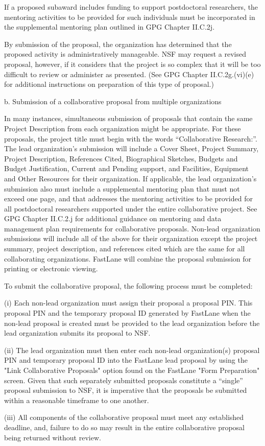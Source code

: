\documentclass[pdftex,12pt,fullpage,oneside]{amsart}
\begin{document}
If a proposed subaward includes funding to support postdoctoral
researchers, the mentoring activities to be provided for such
individuals must be incorporated in the supplemental mentoring plan
outlined in GPG Chapter II.C.2j.

By submission of the proposal, the organization has determined that
the proposed activity is administratively manageable.  NSF may request
a revised proposal, however, if it considers that the project is so
complex that it will be too difficult to review or administer as
presented.  (See GPG Chapter II.C.2g.(vi)(e) for additional
instructions on preparation of this type of proposal.)

 b. Submission of a collaborative proposal from multiple organizations

In many instances, simultaneous submission of proposals that contain
the same Project Description from each organization might be
appropriate.  For these proposals, the project title must begin with
the words ``Collaborative Research:''.  The lead organization's
submission will include a Cover Sheet, Project Summary, Project
Description, References Cited, Biographical Sketches, Budgets and
Budget Justification, Current and Pending support, and Facilities,
Equipment and Other Resources for their organization.  If applicable,
the lead organization’s submission also must include a supplemental
mentoring plan that must not exceed one page, and that addresses the
mentoring activities to be provided for all postdoctoral researchers
supported under the entire collaborative project.  See GPG Chapter
II.C.2.j for additional guidance on mentoring and data management plan
requirements for collaborative proposals.  Non-lead organization
submissions will include all of the above for their organization
except the project summary, project description, and references cited
which are the same for all collaborating organizations.  FastLane will
combine the proposal submission for printing or electronic viewing.

To submit the collaborative proposal, the following process must be
completed: 

(i) Each non-lead organization must assign their proposal a proposal
PIN.  This proposal PIN and the temporary proposal ID generated by
FastLane when the non-lead proposal is created must be provided to the
lead organization before the lead organization submits its proposal to
NSF. 

(ii) The lead organization must then enter each non-lead
organization(s) proposal PIN and temporary proposal ID into the
FastLane lead proposal by using the "Link Collaborative Proposals"
option found on the FastLane "Form Preparation" screen.  Given that
such separately submitted proposals constitute a “single” proposal
submission to NSF, it is imperative that the proposals be submitted
within a reasonable timeframe to one another.  

(iii) All components of the collaborative proposal must meet any
established deadline, and, failure to do so may result in the entire
collaborative proposal being returned without review.
\end{document}
